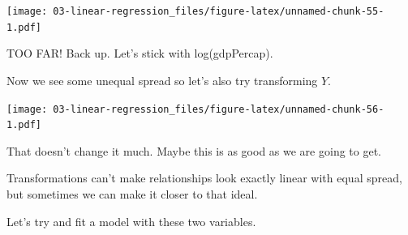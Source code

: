 \documentclass[
]{book}
\newenvironment{Shaded}{\begin{snugshade}}{\end{snugshade}}
\newcommand{\DataTypeTok}[1]{\textcolor[rgb]{0.13,0.29,0.53}{#1}}
\newcommand{\DecValTok}[1]{\textcolor[rgb]{0.00,0.00,0.81}{#1}}
\newcommand{\KeywordTok}[1]{\textcolor[rgb]{0.13,0.29,0.53}{\textbf{#1}}}
\newcommand{\NormalTok}[1]{#1}
\newcommand{\OperatorTok}[1]{\textcolor[rgb]{0.81,0.36,0.00}{\textbf{#1}}}
\newcommand{\StringTok}[1]{\textcolor[rgb]{0.31,0.60,0.02}{#1}}
\begin{document}
\texttt{[image: 03-linear-regression\_files/figure-latex/unnamed-chunk-55-1.pdf]}

TOO FAR! Back up. Let's stick with log(gdpPercap).

Now we see some unequal spread so let's also try transforming \(Y\).

\begin{Shaded}
\end{Shaded}

\texttt{[image: 03-linear-regression\_files/figure-latex/unnamed-chunk-56-1.pdf]}

That doesn't change it much. Maybe this is as good as we are going to get.

Transformations can't make relationships look exactly linear with equal spread, but sometimes we can make it closer to that ideal.

Let's try and fit a model with these two variables.

\begin{Shaded}
\end{Shaded}
\end{document}
